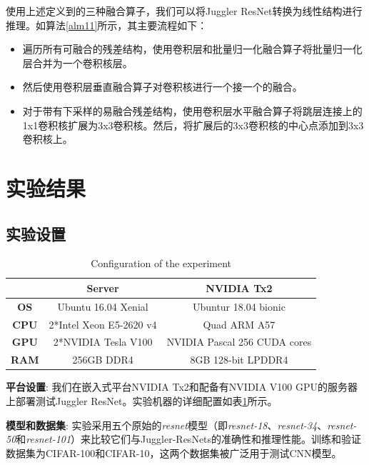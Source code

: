 使用上述定义到的三种融合算子，我们可以将Juggler ResNet转换为线性结构进行推理。如算法\ref{alm11}所示，其主要流程如下：
\begin{itemize}
	\item 遍历所有可融合的残差结构，使用卷积层和批量归一化融合算子将批量归一化层合并为一个卷积核层。 
	\item 然后使用卷积层垂直融合算子对卷积核进行一个接一个的融合。
	\item 对于带有下采样的易融合残差结构，使用卷积层水平融合算子将跳层连接上的1x1卷积核扩展为3x3卷积核。然后，将扩展后的3x3卷积核的中心点添加到3x3卷积核上。
\end{itemize}


\section{实验结果}

\subsection{实验设置}

\begin{table}[h]
	\caption{Configuration of the experiment}
	\centering
	\begin{tabular}{ccc}
		\hline
		& \textbf{Server}                            & \textbf{NVIDIA Tx2}                      \\ \hline
		\textbf{OS}  & Ubuntu 16.04 Xenial               & Ubuntur 18.04 bionic           \\ 
		\textbf{CPU} & 2*Intel Xeon E5-2620 v4     &Quad ARM A57 \\ 
		\textbf{GPU} & 2*NVIDIA Tesla V100               & NVIDIA Pascal 256 CUDA cores   \\ 
		\textbf{RAM} & 256GB DDR4                        & 8GB 128-bit LPDDR4             \\ \hline
	\end{tabular} %
	\label{configuration}
\end{table}


\textbf{平台设置}: 我们在嵌入式平台NVIDIA Tx2和配备有NVIDIA V100 GPU的服务器上部署测试Juggler ResNet。实验机器的详细配置如表\ref{configuration}所示。

\textbf{模型和数据集}: 实验采用五个原始的\emph{resnet}模型（即\emph{resnet-18}、\emph{resnet-34}、\emph{resnet-50}和\emph{resnet-101}）来比较它们与Juggler-ResNets的准确性和推理性能。训练和验证数据集为CIFAR-100和CIFAR-10，这两个数据集被广泛用于测试CNN模型\cite{2009learning}。

